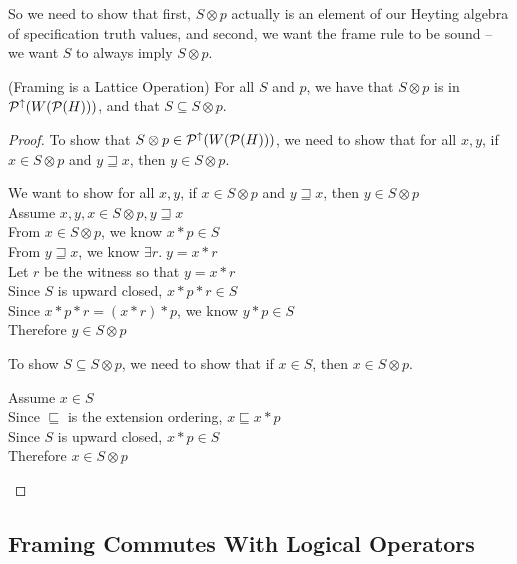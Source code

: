 So we need to show that first, $S \otimes p$ actually is an element of
our Heyting algebra of specification truth values, and second, we want
the frame rule to be sound -- we want $S$ to always imply $S \otimes
p$.

\begin{lemma}{(Framing is a Lattice Operation)}
For all $S$ and $p$, we have that $S \otimes p$ is in $\mathcal{P}^{\uparrow}({W(\mathcal{P}(H)}))$,
and that $S \subseteq S \otimes p $.
\end{lemma}
\begin{proof}
To show that $S \otimes p \in \mathcal{P}^{\uparrow}({W(\mathcal{P}(H))})$, we need to show that for all 
$x,y$, if $x \in S \otimes p$ and $y \sqsupseteq x$, then $y \in S \otimes p$. 

\begin{tabbedproof}
\oo We want to show for all $x,y$, if $x \in S \otimes p$ and $y \sqsupseteq x$, then $y \in S \otimes p$ \\
\oo Assume $x, y, x \in S \otimes p, y \sqsupseteq x$ \\
\ooo From $x \in S \otimes p$, we know $x * p \in S$ \\
\ooo From $y \sqsupseteq x$, we know $\exists r.\; y = x * r$ \\
\ooo Let $r$ be the witness so that $y = x * r$ \\
\oooo Since $S$ is upward closed, $x * p * r \in S$ \\
\oooo Since $x * p * r = (x * r) *p$, we know  $y * p \in S$ \\
\oooo Therefore $y \in S \otimes p$ \\
\end{tabbedproof}

\noindent To show $S \subseteq S \otimes p$, we need to show that if $x \in S$, then $x \in S \otimes p$. 
\begin{tabbedproof}
\oo Assume $x \in S$ \\
\ooo Since $\sqsubseteq$ is the extension ordering, $x \sqsubseteq x * p$ \\   
\ooo Since $S$ is upward closed, $x * p \in S$\\
\ooo Therefore $x \in S \otimes p$ 
\end{tabbedproof}
\end{proof}

\subsection{Framing Commutes With Logical Operators}

